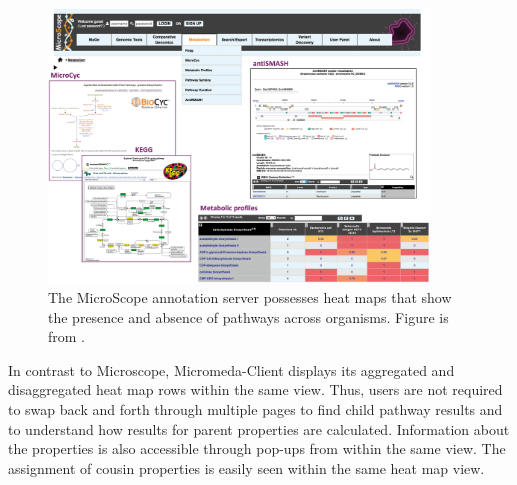 \begin{figure}[!ht]
  \centering
	\includegraphics[width=0.9\textwidth]{media/microscope.png}
	 \caption{The MicroScope annotation server possesses heat maps that show the presence and absence of pathways across organisms. Figure is from \cite{vallenet2016microscope}.}
	 \label{fig:microscope}
\end{figure}

In contrast to Microscope, Micromeda-Client displays its aggregated and disaggregated heat map rows within the same view. Thus, users are not required to swap back and forth through multiple pages to find child pathway results and to understand how results for parent properties are calculated. Information about the properties is also accessible through pop-ups from within the same view. The assignment of cousin properties is easily seen within the same heat map view.

